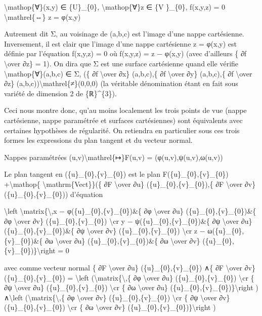\documentclass[]{article}
\begin{document}
\textbackslash{}mathop\{∀\}(x,y) ∈ \{U\}\_\{0\},
\textbackslash{}mathop\{∀\}z ∈ \{V \}\_\{0\}, f(x,y,z) = 0
\textbackslash{}mathrel\{⇔\} z = φ(x,y)

Autrement dit Σ, au voisinage de (a,b,c) est l'image d'une nappe
cartésienne. Inversement, il est clair que l'image d'une nappe
cartésienne z = φ(x,y) est définie par l'équation f(x,y,z) = 0 où
f(x,y,z) = z − φ(x,y) (avec d'ailleurs \{ ∂f \textbackslash{}over ∂z\} =
1). On dira que Σ est une surface cartésienne quand elle vérifie
\textbackslash{}mathop\{∀\}(a,b,c) ∈ Σ, (\{ ∂f \textbackslash{}over ∂x\}
(a,b,c),\{ ∂f \textbackslash{}over ∂y\} (a,b,c),\{ ∂f
\textbackslash{}over ∂z\} (a,b,c))\textbackslash{}mathrel\{≠\}(0,0,0)
(la véritable dénomination étant en fait sous variété de dimension 2 de
\{ℝ\}\^{}\{3\}).

Ceci nous montre donc, qu'au moins localement les trois points de vue
(nappe cartésienne, nappe paramétrée et surfaces cartésiennes) sont
équivalents avec certaines hypothèses de régularité. On retiendra en
particulier sous ces trois formes les expressions du plan tangent et du
vecteur normal.

Nappes paramétrées (u,v)\textbackslash{}mathrel\{↦\}F(u,v) =
(φ(u,v),ψ(u,v),ω(u,v))

Le plan tangent en (\{u\}\_\{0\},\{v\}\_\{0\}) est le plan
F(\{u\}\_\{0\},\{v\}\_\{0\}) +\textbackslash{}mathop\{
\textbackslash{}mathrm\{Vect\}\}(\{ ∂F \textbackslash{}over ∂u\}
(\{u\}\_\{0\},\{v\}\_\{0\}),\{ ∂F \textbackslash{}over ∂v\}
(\{u\}\_\{0\},\{v\}\_\{0\})) d'équation

\textbackslash{}left
\textbar{}\textbackslash{}matrix\{\textbackslash{},x −
φ(\{u\}\_\{0\},\{v\}\_\{0\})\&\{ ∂φ \textbackslash{}over ∂u\}
(\{u\}\_\{0\},\{v\}\_\{0\})\&\{ ∂φ \textbackslash{}over ∂v\}
(\{u\}\_\{0\},\{v\}\_\{0\}) \textbackslash{}cr y −
ψ(\{u\}\_\{0\},\{v\}\_\{0\})\&\{ ∂ψ \textbackslash{}over ∂u\}
(\{u\}\_\{0\},\{v\}\_\{0\})\&\{ ∂ψ \textbackslash{}over ∂v\}
(\{u\}\_\{0\},\{v\}\_\{0\}) \textbackslash{}cr z −
ω(\{u\}\_\{0\},\{v\}\_\{0\})\&\{ ∂ω \textbackslash{}over ∂u\}
(\{u\}\_\{0\},\{v\}\_\{0\})\&\{ ∂ω \textbackslash{}over ∂v\}
(\{u\}\_\{0\},\{v\}\_\{0\})\}\textbackslash{}right \textbar{} = 0

avec comme vecteur normal \{ ∂F \textbackslash{}over ∂u\}
(\{u\}\_\{0\},\{v\}\_\{0\}) ∧\{ ∂F \textbackslash{}over ∂v\}
(\{u\}\_\{0\},\{v\}\_\{0\}) = \textbackslash{}left
(\textbackslash{}matrix\{\textbackslash{},\{ ∂φ \textbackslash{}over
∂u\} (\{u\}\_\{0\},\{v\}\_\{0\}) \textbackslash{}cr \{ ∂ψ
\textbackslash{}over ∂u\} (\{u\}\_\{0\},\{v\}\_\{0\}) \textbackslash{}cr
\{ ∂ω \textbackslash{}over ∂u\}
(\{u\}\_\{0\},\{v\}\_\{0\})\}\textbackslash{}right )
∧\textbackslash{}left (\textbackslash{}matrix\{\textbackslash{},\{ ∂φ
\textbackslash{}over ∂v\} (\{u\}\_\{0\},\{v\}\_\{0\}) \textbackslash{}cr
\{ ∂ψ \textbackslash{}over ∂v\} (\{u\}\_\{0\},\{v\}\_\{0\})
\textbackslash{}cr \{ ∂ω \textbackslash{}over ∂v\}
(\{u\}\_\{0\},\{v\}\_\{0\})\}\textbackslash{}right )
\end{document}
